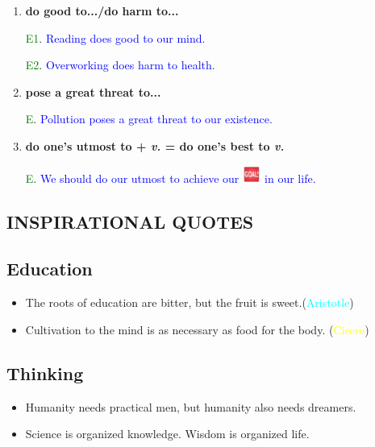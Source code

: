 \documentclass{article}
\begin{document}
\begin{enumerate}
\item \textbf{do good to.../do harm to...}

  \textcolor{green}{E1}. \textcolor{blue}{Reading does good to our mind.}

  \textcolor{green}{E2}. \textcolor{blue}{Overworking does harm to health.}

\item \textbf{pose a great threat to...}

  \textcolor{green}E. \textcolor{blue}{Pollution poses a great threat to our existence.}

\item \textbf{do one's utmost to + \emph{v.} = do one's best to \emph{v.}}

  \textcolor{green}E. \textcolor{blue}{We should do our utmost to achieve our
  }\includegraphics[height=1.5em]{goal} \textcolor{blue}{in our life.}

  
  
\end{enumerate}

\begin{center}
  \section{INSPIRATIONAL QUOTES}
  \label{sec:inspirational-quotes}
\end{center}

\subsection{Education}
\label{sec:education}

\begin{itemize}
\item The roots of education are bitter, but the fruit is
  sweet.(\textcolor{cyan}{Aristotle})
  
\item Cultivation to the mind is as necessary as food for the
body. (\textcolor{yellow}{Cicero})
\end{itemize}


\subsection{Thinking}
\label{sec:thinking}

\begin{itemize}
\item Humanity needs practical men, but humanity also needs dreamers.
\item Science is organized knowledge. Wisdom is organized life.
\end{itemize}
\end{document}
